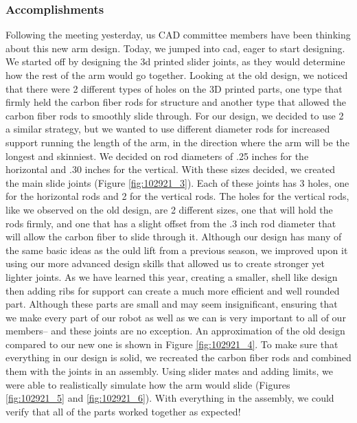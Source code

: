 \subsubsection*{Accomplishments}
Following the meeting yesterday, us CAD committee members have been thinking about this new arm design. Today, we jumped into cad, eager to start designing. We started off by designing the 3d printed slider joints, as they would determine how the rest of the arm would go together. Looking at the old design, we noticed that there were 2 different types of holes on the 3D printed parts, one type that firmly held the carbon fiber rods for structure and another type that allowed the carbon fiber rods to smoothly slide through. For our design, we decided to use 2 a similar strategy, but we wanted to use different diameter rods for increased support running the length of the arm, in the direction where the arm will be the longest and skinniest. We decided on rod diameters of .25 inches for the horizontal and .30 inches for the vertical. With these sizes decided, we created the main slide joints (Figure \ref{fig:102921_3}). Each of these joints has 3 holes, one for the horizontal rods and 2 for the vertical rods. The holes for the vertical rods, like we observed on the old design, are 2 different sizes, one that will hold the rods firmly, and one that has a slight offset from the .3 inch rod diameter that will allow the carbon fiber to slide through it. 
Although our design has many of the same basic ideas as the ould lift from a previous season, we improved upon it using our more advanced design skills that allowed us to create stronger yet lighter joints. As we have learned this year, creating a smaller, shell like design then adding ribs for support can create a much more efficient and well rounded part. Although these parts are small and may seem insignificant, ensuring that we make every part of our robot as well as we can is very important to all of our members-- and these joints are no exception. An approximation of the old design compared to our new one is shown in Figure \ref{fig:102921_4}.
To make sure that everything in our design is solid, we recreated the carbon fiber rods and combined them with the joints in an assembly. Using slider mates and adding limits, we were able to realistically simulate how the arm would slide (Figures \ref{fig:102921_5} and \ref{fig:102921_6}). With everything in the assembly, we could verify that all of the parts worked together as expected!


